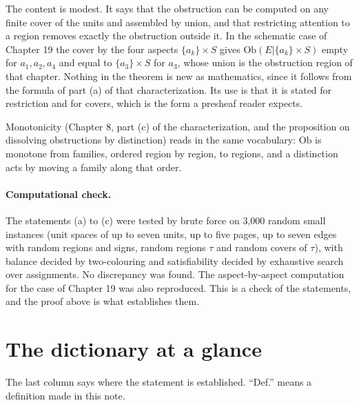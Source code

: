 \documentclass[11pt]{article}
\theoremstyle{plain}
\theoremstyle{definition}
\theoremstyle{remark}
\newcommand{\Ob}{\mathrm{Ob}}
\begin{document}
The content is modest. It says that the obstruction can be computed on any finite cover of the units and assembled by union, and that restricting attention to a region removes exactly the obstruction outside it. In the schematic case of Chapter 19 the cover by the four aspects $\{a_k\}\times S$ gives $\Ob(E|\{a_k\}\times S)$ empty for $a_1,a_2,a_4$ and equal to $\{a_3\}\times S$ for $a_3$, whose union is the obstruction region of that chapter. Nothing in the theorem is new as mathematics, since it follows from the formula of part (a) of that characterization. Its use is that it is stated for restriction and for covers, which is the form a presheaf reader expects.

Monotonicity (Chapter 8, part (c) of the characterization, and the proposition on dissolving obstructions by distinction) reads in the same vocabulary: $\Ob$ is monotone from families, ordered region by region, to regions, and a distinction acts by moving a family along that order.

\paragraph{Computational check.} The statements (a) to (c) were tested by brute force on 3{,}000 random small instances (unit spaces of up to seven units, up to five pages, up to seven edges with random regions and signs, random regions $\tau$ and random covers of $\tau$), with balance decided by two-colouring and satisfiability decided by exhaustive search over assignments. No discrepancy was found. The aspect-by-aspect computation for the case of Chapter 19 was also reproduced. This is a check of the statements, and the proof above is what establishes them.


\section{The dictionary at a glance}\label{sec:dict}

The last column says where the statement is established. ``Def.'' means a definition made in this note.
\end{document}
